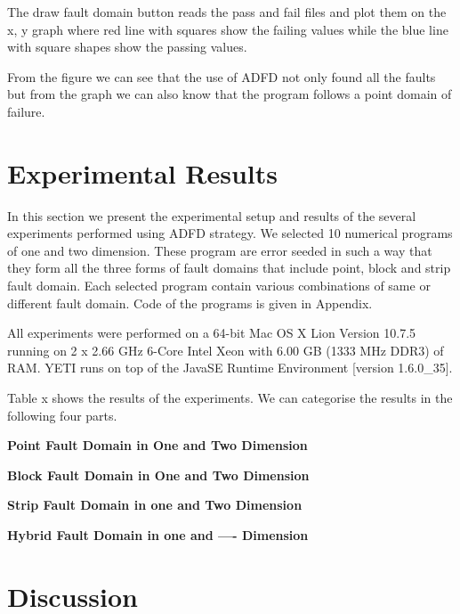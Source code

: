 \documentclass{acm_proc_article-sp}
\begin{document}
The draw fault domain button reads the pass and fail files and plot them on the x, y graph where red line with squares show the failing values while the blue line with square shapes show the passing values.

From the figure {} we can see that the use of ADFD not only found all the faults but from the graph we can also know that the program follows a point domain of failure.





\section{Experimental Results} \label{sec:experimentalResults}
In this section we present the experimental setup and results of the several experiments performed using ADFD strategy. We selected 10 numerical programs of one and two dimension. These program are error seeded in such a way that they form all the three forms of fault domains that include point, block and strip fault domain. Each selected program contain various combinations of same or different fault domain. Code of the programs is given in Appendix. 

All experiments were performed on a 64-bit Mac OS X Lion Version 10.7.5 running on 2 x 2.66 GHz 6-Core Intel Xeon with 6.00 GB (1333 MHz DDR3) of RAM. YETI runs on top of the Java\texttrademark  SE Runtime Environment [version 1.6.0\_35]. 

Table x shows the results of the experiments. We can categorise the results in the following four parts.

\textbf{ Point Fault Domain in One and Two Dimension }

\textbf{ Block Fault Domain in One and Two Dimension }

\textbf{ Strip Fault Domain in one and Two Dimension }

\textbf{ Hybrid Fault Domain in one and ---- Dimension }



\section{Discussion} \label{sec:discussion}
\end{document}
